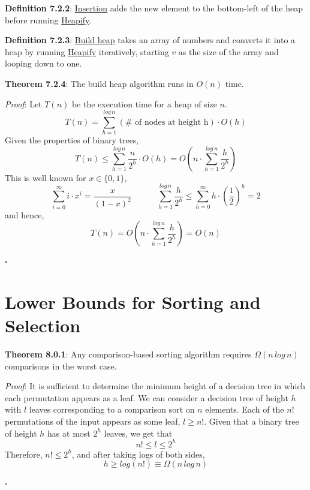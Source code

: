 \documentclass{article}
\newcommand{\separate}[1] {\vspace{#1 pt}\noindent}
\newcommand{\definition}[2]{\textbf{Definition #1}: #2\label{def:#1}}
\newcommand{\proof}[2]{\textit{Proof}: #2 \begin{flushright}\(\square\)\end{flushright}\label{prf:#1}}
\newcommand{\theorem}[3]{\textbf{Theorem #1}: #2 \par\separate{3}\proof{thm:#1}{#3}\label{thm:#1}}
\begin{document}
\noindent\definition{7.2.2}{\underline{Insertion} adds the new element to the bottom-left of the heap before running \hyperref[alg:Heapify]{Heapify}.}

\separate{7}\definition{7.2.3}{\underline{Build heap} takes an array of numbers and converts it into a heap by running \hyperref[alg:Heapify]{Heapify} iteratively, starting \(v\) as the size of the array and looping down to one.}

\separate{7}\theorem{7.2.4}{The build heap algorithm runs in \(O(n)\) time.}
{Let \(T(n)\) be the execution time for a heap of size \(n\).
    \begin{equation}
        T(n) = \sum^{log\,n}_{h=1} (\# \text{ of nodes at height h}) \cdot O(h)
    \end{equation}
    Given the properties of binary trees, 
    \begin{equation}
        T(n) \leq \sum^{log\,n}_{h=1} \frac{n}{2^h} \cdot O(h) = O\left( n \cdot \sum^{log\,n}_{h=1} \frac{h}{2^h} \right)
    \end{equation}
    This is well known for \(x \in \{0,1\}\),
    \begin{equation}
        \sum^\infty_{i=0} i \cdot x^i = \frac{x}{(1-x)^2} \quad\quad\quad \sum^{log \, n}_{h=1} \frac{h}{2^h} \leq \sum^\infty_{h=0}h \cdot \left(\frac{1}{2}\right)^h = 2
    \end{equation}
    and hence,
    \begin{equation}
        T(n) = O \left(n \cdot \sum^{log \, n}_{h=1} \frac{h}{2^h}\right) = O(n)
    \end{equation}
}

\newpage\section{Lower Bounds for Sorting and Selection}

\theorem{8.0.1}{Any comparison-based sorting algorithm requires \(\Omega(n\,log\,n)\) comparisons in the worst case.}
{It is sufficient to determine the minimum height of a decision tree in which each permutation appears as a leaf. 
We can consider a decision tree of height \(h\) with \(l\) leaves corresponding to a comparison sort on \(n\) elements. Each of the \(n!\) permutations of the input appears as some leaf, \(l \geq n!\). Given that a binary tree of height \(h\) has at most \(2^h\) leaves, we get that
\begin{equation}
    n! \leq l \leq 2^h
\end{equation}
Therefore, \(n! \leq 2^h\), and after taking logs of both sides,
\begin{equation}
    h \geq log(n!) \equiv \Omega(n\,log\,n)
\end{equation}}
\end{document}
